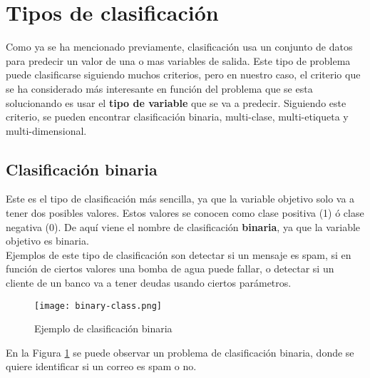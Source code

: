 \section{Tipos de clasificación}
Como ya se ha mencionado previamente, clasificación usa un conjunto de datos para predecir un valor de una o mas variables de salida. Este tipo de problema puede clasificarse siguiendo muchos criterios, pero en nuestro caso, el criterio que se ha considerado más interesante en función del problema que se esta solucionando es usar el \textbf{tipo de variable} que se va a predecir. Siguiendo este criterio, se pueden encontrar clasificación binaria, multi-clase, multi-etiqueta y multi-dimensional.
\subsection*{Clasificación binaria}
Este es el tipo de clasificación más sencilla, ya que la variable objetivo solo va a tener dos posibles valores. Estos valores se conocen como clase positiva (1) ó clase negativa (0). De aquí viene el nombre de clasificación \textbf{binaria}, ya que la variable objetivo es binaria.\\
Ejemplos de este tipo de clasificación son detectar si un mensaje es spam, si en función de ciertos valores una bomba de agua puede fallar, o detectar si un cliente de un banco va a tener deudas usando ciertos parámetros.
\begin{figure}[H]
	\centering
	\texttt{[image: binary-class.png]}
	\caption{Ejemplo de clasificación binaria}
	\label{fig:bclass}
\end{figure}
En la Figura \ref{fig:bclass} se puede observar un problema de clasificación binaria, donde se quiere identificar si un correo es spam o no. 
